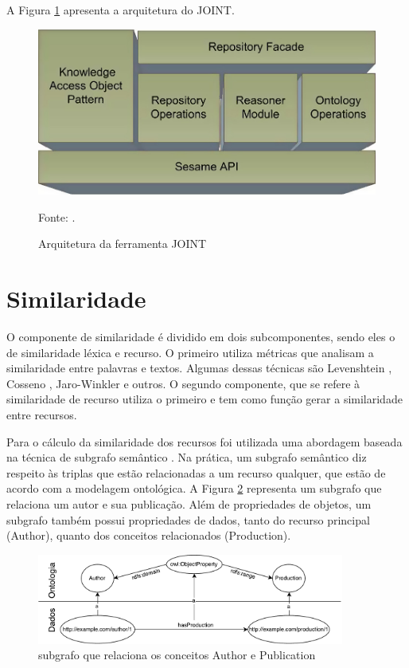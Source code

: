 A Figura \ref{fig:joint} apresenta a arquitetura do JOINT.

\begin{figure}[!ht]
	\centering
	\includegraphics[width=1\textwidth]{./imagens/joint.png}
	\caption{Arquitetura da ferramenta JOINT}
	\footnotesize{Fonte: \cite{holanda2013joint}.}
	\label{fig:joint}
\end{figure}

\section{Similaridade}
O componente de similaridade é dividido em dois subcomponentes, sendo eles o de similaridade léxica e recurso. O primeiro utiliza métricas que analisam a similaridade entre palavras e textos. Algumas dessas técnicas são Levenshtein \cite{levenshtein1966binary}, Cosseno \cite{singhal2001modern}, Jaro-Winkler \cite{winkler1990string} e outros. O segundo componente, que se refere à similaridade de recurso utiliza o primeiro e tem como função gerar a similaridade entre recursos.

Para o cálculo da similaridade dos recursos foi utilizada uma abordagem baseada na técnica de subgrafo semântico \cite{wang2008lily}. Na prática, um subgrafo semântico diz respeito às triplas que estão relacionadas a um recurso qualquer, que estão de acordo com a modelagem ontológica. A Figura \ref{fig:subgrafo} representa um subgrafo que relaciona um autor e sua publicação. Além de propriedades de objetos, um subgrafo também possui propriedades de dados, tanto do recurso principal (Author), quanto dos conceitos relacionados (Production). %

\begin{figure}[!ht]
	\centering
	\includegraphics[width=0.9\textwidth]{./imagens/subgrafo_semantico.pdf}
    \caption{subgrafo que relaciona os conceitos Author e Publication}
	\label{fig:subgrafo}
\end{figure}


